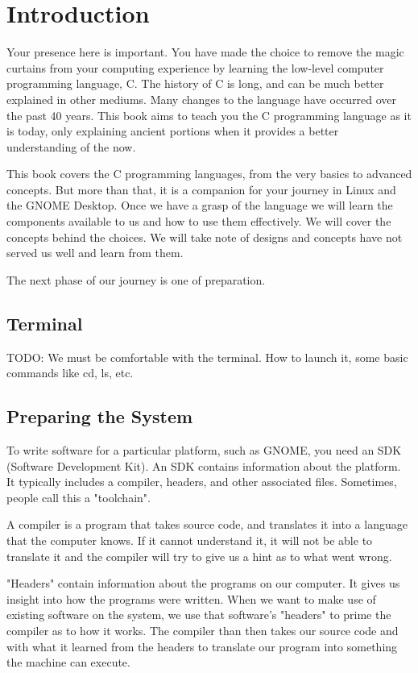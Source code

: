 \chapter{Introduction}

Your presence here is important. You have made the choice to remove the magic
curtains from your computing experience by learning the low-level computer
programming language, C. The history of C is long, and can be much better
explained in other mediums. Many changes to the language have occurred over
the past 40 years. This book aims to teach you the C programming language as
it is today, only explaining ancient portions when it provides a better
understanding of the now.

This book covers the C programming languages, from the very basics to advanced
concepts. But more than that, it is a companion for your journey in Linux and
the GNOME Desktop. Once we have a grasp of the language we will learn the
components available to us and how to use them effectively. We will cover the
concepts behind the choices. We will take note of designs and concepts have
not served us well and learn from them.

The next phase of our journey is one of preparation.


\section{Terminal}

TODO: We must be comfortable with the terminal. How to launch it, some
basic commands like cd, ls, etc.


\section{Preparing the System}

To write software for a particular platform, such as GNOME, you need an SDK
(Software Development Kit). An SDK contains information about the platform. It
typically includes a compiler, headers, and other associated files. Sometimes,
people call this a "toolchain".

A compiler is a program that takes source code, and translates it into a
language that the computer knows. If it cannot understand it, it will not be
able to translate it and the compiler will try to give us a hint as to what
went wrong.

"Headers" contain information about the programs on our computer.  It gives us
insight into how the programs were written. When we want to make use of
existing software on the system, we use that software's "headers" to prime the
compiler as to how it works. The compiler than then takes our source code and
with what it learned from the headers to translate our program into something
the machine can execute.


